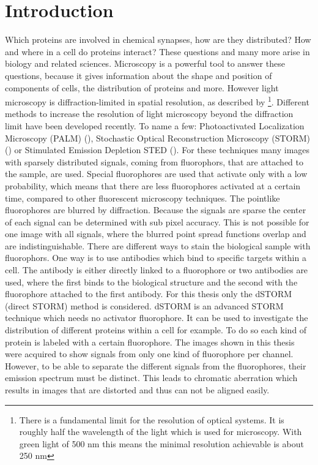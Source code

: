 \chapter{Introduction}
Which proteins are involved in chemical synapses, how are they distributed? How and where in a cell do proteins interact? These questions and many more arise in biology and related sciences. Microscopy is a powerful tool to answer these questions, because it gives information about the shape and position of components of cells, the distribution of proteins and more. However light microscopy is diffraction-limited in spatial resolution, as described by \cite{Abbe} \footnote{There is a fundamental limit for the resolution of optical systems. It is roughly half the wavelength of the light which is used for microscopy. With green light of 500 nm this means the minimal resolution achievable is about 250 nm}. Different methods to increase the resolution of light microscopy beyond the diffraction limit have been developed recently. To name a few: Photoactivated Localization Microscopy (PALM) (\cite{Palm}), Stochastic Optical Reconstruction Microscopy (STORM) (\cite{Storm}) or Stimulated Emission Depletion STED (\cite{sted}).\newline
For these techniques many images with sparsely distributed signals, coming from fluorophors, that are attached to the sample, are used. Special fluorophores are used that activate only with a low probability, which means that there are less fluorophores activated at a certain time, compared to other fluorescent microscopy techniques. The pointlike fluorophores are blurred by diffraction. Because the signals are sparse the center of each signal can be determined with sub pixel accuracy. This is not possible for one image with all signals, where the blurred point spread functions overlap and are indistinguishable. There are different ways to stain the biological sample with fluorophors. One way is to use antibodies which bind to specific targets within a cell. The antibody is either directly linked to a fluorophore or two antibodies are used, where the first binds to the biological structure and the second with the fluorophore attached to the first antibody. 
\newline
For this thesis only the dSTORM (direct STORM) method is considered. dSTORM is an advanced STORM technique which needs no activator fluorophore. It can be used to investigate the distribution of different proteins within a cell for example. To do so each kind of protein is labeled with a certain fluorophore. The images shown in this thesis were acquired to show signals from only one kind of fluorophore per channel. However, to be able to separate the different signals from the fluorophores, their emission spectrum must be distinct. This leads to chromatic aberration which results in images that are distorted and thus can not be aligned easily.\newline 
